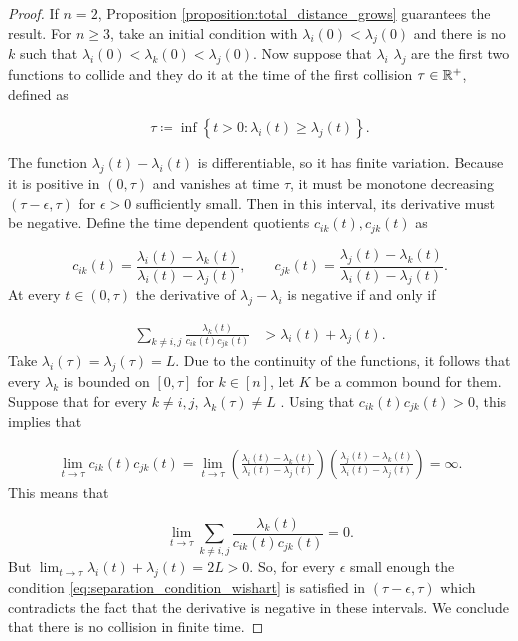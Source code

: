 \begin{proof}
   If $n=2$, Proposition \ref{proposition:total_distance_grows} guarantees the result. For $n\ge 3$, take an initial condition with $\lambda_i(0) < \lambda_j(0)$ and there is no $k$ such that $\lambda_i(0) < \lambda_k(0) < \lambda_j(0)$. Now suppose that $\lambda_i$ $\lambda_j$ are the first two functions to collide and they do it at the time of the first collision $\tau \in \mathbb R^+$, defined as 

   \begin{equation*}
       \tau \coloneqq \inf\left\{ t > 0 \colon \lambda_i(t) \ge \lambda_j(t) \right\}.
   \end{equation*}

   The function $\lambda_j(t) - \lambda_i(t)$ is differentiable, so it has finite variation. Because it is positive in $(0, \tau)$ and vanishes at time $\tau$, it must be monotone decreasing $(\tau-\epsilon, \tau)$ for $\epsilon >0$ sufficiently small. Then in this interval, its derivative must be negative. %
   Define the time dependent quotients $c_{ik}(t),c_{jk}(t)$ as 

    \begin{equation*}
        c_{ik}(t) = \frac{\lambda_i(t) - \lambda_k(t)}{\lambda_i(t) - \lambda_j(t)}, \qquad c_{jk}(t) = \frac{\lambda_j(t) - \lambda_k(t)}{\lambda_i(t) - \lambda_j(t)}.
    \end{equation*}
    At every $t \in (0,\tau)$ the derivative of $\lambda_j - \lambda_i$ is negative if and only if

    \begin{align*}
        \sum_{k \neq i,j} \frac{\lambda_k(t)}{c_{ik}(t)c_{jk}(t)} &> \lambda_i(t) + \lambda_j(t). 
    \end{align*}
    Take $\lambda_i(\tau) = \lambda_j(\tau) = L$. Due to the continuity of the functions, it follows that every $\lambda_k$ is bounded on $[0,\tau]$ for $k \in [n]$, let $K$ be a common bound for them. Suppose that for every $k \neq i,j$, $\lambda_k(\tau) \neq L$ . Using that $c_{ik}(t)c_{jk}(t) > 0$, this implies that

    \begin{align*}
        \lim_{t\to \tau} c_{ik}(t)c_{jk}(t) = \lim_{t\to\tau} \left(\frac{\lambda_i(t) - \lambda_k(t)}{\lambda_i(t) - \lambda_j(t)}\right)\left(\frac{\lambda_j(t) - \lambda_k(t)}{\lambda_i(t) - \lambda_j(t)}\right) = \infty.
    \end{align*}
    This means that   

    \begin{equation*}
        \lim_{t\to\tau} \sum_{k\neq i,j} \frac{\lambda_k(t)}{c_{ik}(t)c_{jk}(t)} = 0.
    \end{equation*}
    But $\lim_{t\to\tau} \lambda_i(t) + \lambda_j(t) = 2L >0$. So, for every $\epsilon$ small enough the condition \eqref{eq:separation_condition_wishart} is satisfied in $(\tau-\epsilon,\tau)$ which contradicts the fact that the derivative is negative in these intervals. We conclude that there is no collision in finite time.
    \end{proof}

